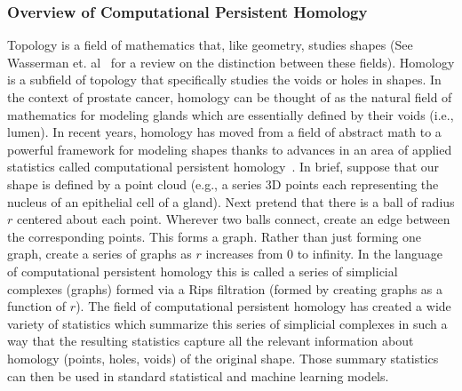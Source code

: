 \documentclass{NIHGrant}
\theoremstyle{theorem}
\begin{document}
\subsubsection*{Overview of Computational Persistent Homology}
Topology is a field of mathematics that, like geometry, studies shapes (See Wasserman et. al~\cite{wasserman_topological_2018} for a review on the distinction between these fields). Homology is a subfield of topology that specifically studies the voids or holes in shapes. In the context of prostate cancer, homology can be thought of as the natural field of mathematics for modeling glands which are essentially defined by their voids (i.e., lumen). In recent years, homology has moved from a field of abstract math to a powerful framework for modeling shapes thanks to advances in an area of applied statistics called computational persistent homology~\cite{wasserman_topological_2018,chazal_introduction_2021}. In brief, suppose that our shape is defined by a point cloud (e.g., a series 3D points each representing the nucleus of an epithelial cell of a gland). Next pretend that there is a ball of radius \(r\) centered about each point. Wherever two balls connect, create an edge between the corresponding points. This forms a graph. Rather than just forming one graph, create a series of graphs as \(r\) increases from 0 to infinity. In the language of computational persistent homology this is called a series of simplicial complexes (graphs) formed via a Rips filtration (formed by creating graphs as a function of \(r\)). The field of computational persistent homology has created a wide variety of statistics which summarize this series of simplicial complexes in such a way that the resulting statistics capture all the relevant information about homology (points, holes, voids) of the original shape. Those summary statistics can then be used in standard statistical and machine learning models.
\end{document}
